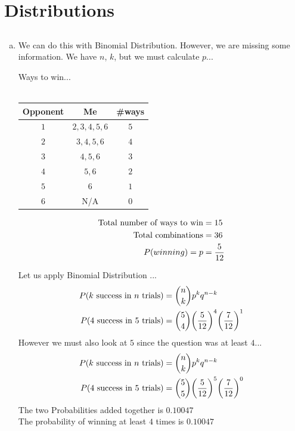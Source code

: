 \documentclass[10pt]{report}
\begin{document}
\section{\sc\color{cit}Distributions}
\setcounter{subsection}{6}
\subsection{}
 \begin{enumerate}[(a)]
 \item We can do this with Binomial Distribution. However, we are missing some information. We have $n$, $k$, but we must calculate $p$... 
   \begin{center}
 Ways to win... \\
 \ \\
 \begin{tabular}{ |c|c|c| }
 \hline
Opponent & Me & \#ways \\
\hline
$1$ & $2, 3, 4, 5, 6 $ & $5$ \\
\hline
$2$ & $ 3, 4, 5, 6 $ & $4$ \\
\hline
$3$ & $ 4, 5, 6 $ & $3$ \\
\hline
$4$ & $ 5, 6$ & $2$ \\
\hline
$5$ & $ 6$ & $1 $ \\
\hline
$6 $ & N/A & $0 $ \\
\hline
 \end{tabular}
\begin{align*}
\textnormal{Total number of ways to win} &= 15 \\
\textnormal{Total combinations} &= 36 \\
P(winning) = p &= \frac{5}{12}
\end{align*}
 \end{center}
 Let us apply Binomial Distribution ... \\
 \begin{align*}
 P(k \textnormal{ success in } n \textnormal{ trials}) &= \binom{n}{k}p^kq^{n-k}  \\
  P(4 \textnormal{ success in } 5 \textnormal{ trials}) &= \binom{5}{4}\bigg(\frac{5}{12}\bigg)^4\bigg(\frac{7}{12}\bigg)^{1}  \\
 \end{align*}
 However we must also look at $5 $ since the question was at least $4 $...
  \begin{align*}
 P(k \textnormal{ success in } n \textnormal{ trials}) &= \binom{n}{k}p^kq^{n-k}  \\
  P(4 \textnormal{ success in } 5 \textnormal{ trials}) &= \binom{5}{5}\bigg(\frac{5}{12}\bigg)^5\bigg(\frac{7}{12}\bigg)^{0}  \\
 \end{align*}
 The two Probabilities added together is $0.10047$ \\
 The probability of winning at least $4 $ times is $\mathbf{0.10047}$
\end{enumerate}
\setcounter{subsection}{9}
\end{document}
